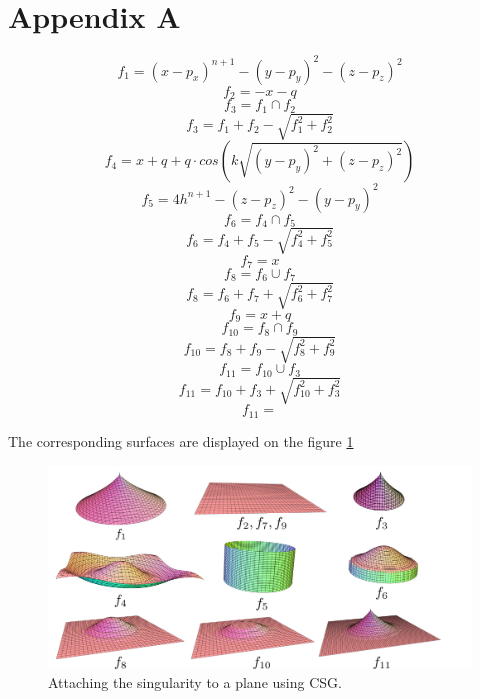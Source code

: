 \chapter*{Appendix A}
\label{appA}

$$f_1 = (x - p_x)^{n+1} - (y - p_y)^2 - (z - p_z)^2$$
$$f_2 = - x - q$$
$$f_3 = f_1 \cap f_2$$
$$f_3 = f_1+f_2-\sqrt{f_1^2+f_2^2}$$
$$f_4 = x + q + q \cdot cos\left(k \sqrt{(y - p_y)^2 + (z - p_z)^2}\right)$$
$$f_5 = 4 h^{n+1} - (z - p_z)^2 - (y - p_y)^2$$
$$f_6 = f_4 \cap f_5$$
$$f_6 = f_4+f_5-\sqrt{f_4^2+f_5^2}$$
$$f_7 = x$$
$$f_8 = f_6 \cup f_7$$
$$f_8 = f_6 + f_7 + \sqrt{f_6^2+f_7^2}$$
$$f_9 = x+q$$
$$f_{10} = f_8 \cap f_9$$
$$f_{10} = f_8 + f_9 - \sqrt{f_8^2+f_9^2}$$
$$f_{11} = f_{10} \cup f_3$$
$$f_{11} = f_{10} + f_3 + \sqrt{f_{10}^2+f_3^2}$$
$$f_{11} = $$

The corresponding surfaces are displayed on the figure \ref{img:27}
\begin{figure}
    \centerline{\includegraphics[scale=0.5]{images/img27}}
    \caption[Attaching the singularity to a plane using CSG]
    {Attaching the singularity to a plane using CSG.}
    \label{img:27}
\end{figure}